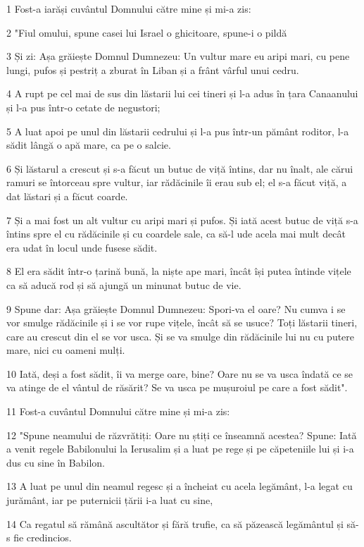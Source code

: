 \par 1 Fost-a iarăși cuvântul Domnului către mine și mi-a zis:
\par 2 "Fiul omului, spune casei lui Israel o ghicitoare, spune-i o pildă
\par 3 Și zi: Așa grăiește Domnul Dumnezeu: Un vultur mare eu aripi mari, cu pene lungi, pufos și pestriț a zburat în Liban și a frânt vârful unui cedru.
\par 4 A rupt pe cel mai de sus din lăstarii lui cei tineri și l-a adus în țara Canaanului și l-a pus într-o cetate de negustori;
\par 5 A luat apoi pe unul din lăstarii cedrului și l-a pus într-un pământ roditor, l-a sădit lângă o apă mare, ca pe o salcie.
\par 6 Și lăstarul a crescut și s-a făcut un butuc de viță întins, dar nu înalt, ale cărui ramuri se întorceau spre vultur, iar rădăcinile îi erau sub el; el s-a făcut viță, a dat lăstari și a făcut coarde.
\par 7 Și a mai fost un alt vultur cu aripi mari și pufos. Și iată acest butuc de viță s-a întins spre el cu rădăcinile și cu coardele sale, ca să-l ude acela mai mult decât era udat în locul unde fusese sădit.
\par 8 El era sădit într-o țarină bună, la niște ape mari, încât își putea întinde vițele ca să aducă rod și să ajungă un minunat butuc de vie.
\par 9 Spune dar: Așa grăiește Domnul Dumnezeu: Spori-va el oare? Nu cumva i se vor smulge rădăcinile și i se vor rupe vițele, încât să se usuce? Toți lăstarii tineri, care au crescut din el se vor usca. Și se va smulge din rădăcinile lui nu cu putere mare, nici cu oameni mulți.
\par 10 Iată, deși a fost sădit, îi va merge oare, bine? Oare nu se va usca îndată ce se va atinge de el vântul de răsărit? Se va usca pe mușuroiul pe care a fost sădit".
\par 11 Fost-a cuvântul Domnului către mine și mi-a zis:
\par 12 "Spune neamului de răzvrătiți: Oare nu știți ce înseamnă acestea? Spune: Iată a venit regele Babilonului la Ierusalim și a luat pe rege și pe căpeteniile lui și i-a dus cu sine în Babilon.
\par 13 A luat pe unul din neamul regesc și a încheiat cu acela legământ, l-a legat cu jurământ, iar pe puternicii țării i-a luat cu sine,
\par 14 Ca regatul să rămână ascultător și fără trufie, ca să păzească legământul și să-s fie credincios.
